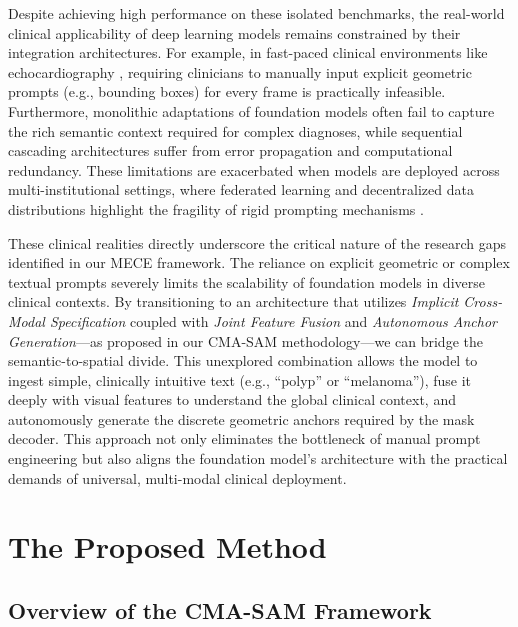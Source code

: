 \documentclass[onecolumn]{IEEEtran}
\numberwithin{equation}{section}
\theoremstyle{definition}
\theoremstyle{remark}
\begin{document}
Despite achieving high performance on these isolated benchmarks, the real-world clinical applicability of deep learning models \cite{defauw2018clinically} remains constrained by their integration architectures. For example, in fast-paced clinical environments like echocardiography \cite{madani2022artificial}, requiring clinicians to manually input explicit geometric prompts (e.g., bounding boxes) for every frame is practically infeasible. Furthermore, monolithic adaptations of foundation models often fail to capture the rich semantic context required for complex diagnoses, while sequential cascading architectures suffer from error propagation and computational redundancy. These limitations are exacerbated when models are deployed across multi-institutional settings, where federated learning and decentralized data distributions highlight the fragility of rigid prompting mechanisms \cite{sheller2019multi}.

These clinical realities directly underscore the critical nature of the research gaps identified in our MECE framework. The reliance on explicit geometric or complex textual prompts severely limits the scalability of foundation models in diverse clinical contexts. By transitioning to an architecture that utilizes \textit{Implicit Cross-Modal Specification} coupled with \textit{Joint Feature Fusion} and \textit{Autonomous Anchor Generation}---as proposed in our CMA-SAM methodology---we can bridge the semantic-to-spatial divide. This unexplored combination allows the model to ingest simple, clinically intuitive text (e.g., ``polyp'' or ``melanoma''), fuse it deeply with visual features to understand the global clinical context, and autonomously generate the discrete geometric anchors required by the mask decoder. This approach not only eliminates the bottleneck of manual prompt engineering but also aligns the foundation model's architecture with the practical demands of universal, multi-modal clinical deployment.
\section{The Proposed Method}


\subsection{Overview of the CMA-SAM Framework}
\end{document}
